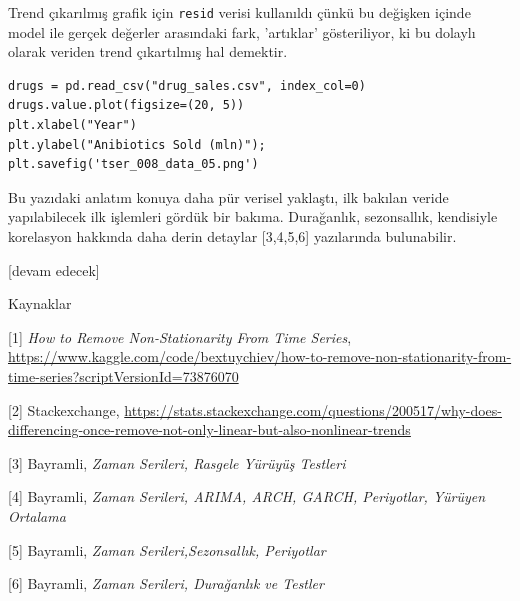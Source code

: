 \documentclass[12pt,fleqn]{article}\usepackage{../../common}
\begin{document}
Trend çıkarılmış grafik için \verb!resid! verisi kullanıldı çünkü bu değişken
içinde model ile gerçek değerler arasındaki fark, 'artıklar' gösteriliyor, ki bu
dolaylı olarak veriden trend çıkartılmış hal demektir.

\begin{verbatim}
drugs = pd.read_csv("drug_sales.csv", index_col=0)
drugs.value.plot(figsize=(20, 5))
plt.xlabel("Year")
plt.ylabel("Anibiotics Sold (mln)");
plt.savefig('tser_008_data_05.png')
\end{verbatim}








Bu yazıdaki anlatım konuya daha pür verisel yaklaştı, ilk bakılan veride
yapılabilecek ilk işlemleri gördük bir bakıma. Durağanlık, sezonsallık,
kendisiyle korelasyon hakkında daha derin detaylar [3,4,5,6] yazılarında
bulunabilir.

[devam edecek]

Kaynaklar

[1] {\em How to Remove Non-Stationarity From Time Series},
    \url{https://www.kaggle.com/code/bextuychiev/how-to-remove-non-stationarity-from-time-series?scriptVersionId=73876070}

[2] Stackexchange,
    \url{https://stats.stackexchange.com/questions/200517/why-does-differencing-once-remove-not-only-linear-but-also-nonlinear-trends}

[3] Bayramli, {\em Zaman Serileri, Rasgele Yürüyüş Testleri}

[4] Bayramli, {\em Zaman Serileri, ARIMA, ARCH, GARCH, Periyotlar, Yürüyen Ortalama}

[5] Bayramli, {\em Zaman Serileri,Sezonsallık, Periyotlar}

[6] Bayramli, {\em Zaman Serileri, Durağanlık ve Testler}
\end{document}
